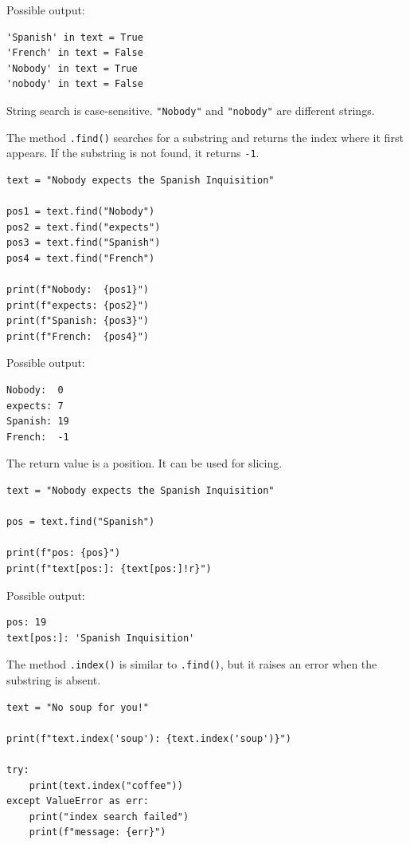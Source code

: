 Possible output:

\begin{verbatim}
'Spanish' in text = True
'French' in text = False
'Nobody' in text = True
'nobody' in text = False
\end{verbatim}

String search is case-sensitive. \texttt{"Nobody"} and \texttt{"nobody"} are different strings.

The method \texttt{.find()} searches for a substring and returns the index where it first appears. If the substring is not found, it returns \texttt{-1}.

\begin{verbatim}
text = "Nobody expects the Spanish Inquisition"

pos1 = text.find("Nobody")
pos2 = text.find("expects")
pos3 = text.find("Spanish")
pos4 = text.find("French")

print(f"Nobody:  {pos1}")
print(f"expects: {pos2}")
print(f"Spanish: {pos3}")
print(f"French:  {pos4}")
\end{verbatim}

Possible output:

\begin{verbatim}
Nobody:  0
expects: 7
Spanish: 19
French:  -1
\end{verbatim}

The return value is a position. It can be used for slicing.

\begin{verbatim}
text = "Nobody expects the Spanish Inquisition"

pos = text.find("Spanish")

print(f"pos: {pos}")
print(f"text[pos:]: {text[pos:]!r}")
\end{verbatim}

Possible output:

\begin{verbatim}
pos: 19
text[pos:]: 'Spanish Inquisition'
\end{verbatim}

The method \texttt{.index()} is similar to \texttt{.find()}, but it raises an error when the substring is absent.

\begin{verbatim}
text = "No soup for you!"

print(f"text.index('soup'): {text.index('soup')}")

try:
    print(text.index("coffee"))
except ValueError as err:
    print("index search failed")
    print(f"message: {err}")
\end{verbatim}

